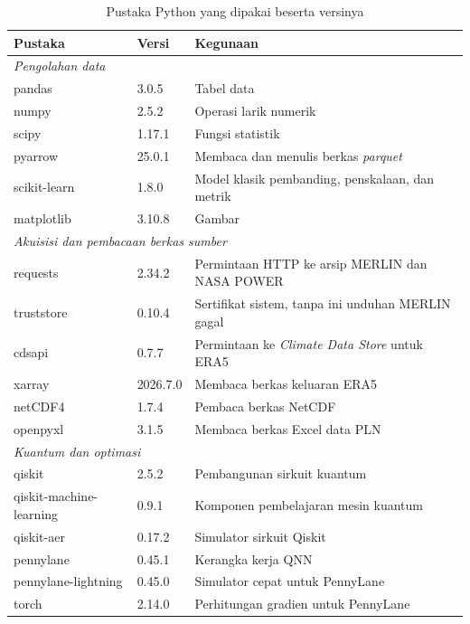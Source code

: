 \begin{table}[!t]
  \caption{Pustaka Python yang dipakai beserta versinya}
  \label{tab:pustaka}
  \small
  \begin{tabular}{ | l | l | p{} | }
    \hline
    Pustaka & Versi & Kegunaan \\
    \hline
    \multicolumn{3}{|l|}{\textit{Pengolahan data}} \\
    \hline
    pandas & 3.0.5 & Tabel data \\
    numpy & 2.5.2 & Operasi larik numerik \\
    scipy & 1.17.1 & Fungsi statistik \\
    pyarrow & 25.0.1 & Membaca dan menulis berkas \textit{parquet} \\
    scikit-learn & 1.8.0 & Model klasik pembanding, penskalaan, dan metrik \\
    matplotlib & 3.10.8 & Gambar \\
    \hline
    \multicolumn{3}{|l|}{\textit{Akuisisi dan pembacaan berkas sumber}} \\
    \hline
    requests & 2.34.2 & Permintaan HTTP ke arsip MERLIN dan NASA POWER \\
    truststore & 0.10.4 & Sertifikat sistem, tanpa ini unduhan MERLIN gagal \\
    cdsapi & 0.7.7 & Permintaan ke \textit{Climate Data Store} untuk ERA5 \\
    xarray & 2026.7.0 & Membaca berkas keluaran ERA5 \\
    netCDF4 & 1.7.4 & Pembaca berkas NetCDF \\
    openpyxl & 3.1.5 & Membaca berkas Excel data PLN \\
    \hline
    \multicolumn{3}{|l|}{\textit{Kuantum dan optimasi}} \\
    \hline
    qiskit & 2.5.2 & Pembangunan sirkuit kuantum \\
    qiskit-machine-learning & 0.9.1 & Komponen pembelajaran mesin kuantum \\
    qiskit-aer & 0.17.2 & Simulator sirkuit Qiskit \\
    pennylane & 0.45.1 & Kerangka kerja QNN \\
    pennylane-lightning & 0.45.0 & Simulator cepat untuk PennyLane \\
    torch & 2.14.0 & Perhitungan gradien untuk PennyLane \\
    \hline
  \end{tabular}
\end{table}


